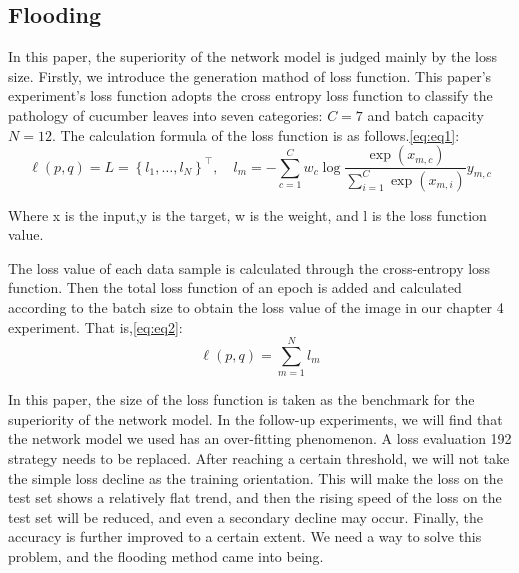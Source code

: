 \documentclass[a4paper,fleqn]{cas-sc}
\begin{document}
\subsection{Flooding}
In this paper, the superiority of the network model is judged mainly by the loss size. Firstly, we introduce the generation mathod of loss function. This paper's experiment's loss function adopts the cross entropy loss function to classify the pathology of cucumber leaves into seven categories: $C=7$ and batch capacity $N=12$. The calculation formula of the loss function is as follows.\ref{eq:eq1}:
\begin{equation}
\label{eq:eq1}
\ell(p, q)=L=\left\{l_{1}, \ldots, l_{N}\right\}^{\top}, \quad l_{m}=-\sum_{c=1}^{C} w_{c} \log \frac{\exp \left(x_{m, c}\right)}{\sum_{i=1}^{C} \exp \left(x_{m, i}\right)} y_{m, c}
\end{equation}

Where x is the input,y is the target, w is the weight, and l is the loss function value. 

The loss value of each data sample is calculated through the cross-entropy loss function. Then the total loss function of an epoch is added and calculated according to the batch size to obtain the loss value of the image in our chapter 4 experiment. That is,\ref{eq:eq2}:
\begin{equation}
\label{eq:eq2}
\ell(p,q)=\sum_{m=1}^{N} l_{m}
\end{equation}

In this paper, the size of the loss function is taken as the benchmark for the superiority of the network model. In the follow-up experiments, we will find that the network model we used has an over-fitting phenomenon. A loss evaluation 192
strategy needs to be replaced. After reaching a certain threshold, we will  not take the simple loss decline as the training orientation. This will make the loss on the test set shows a relatively flat trend, and then the rising speed of the loss on the test set will be reduced, and even a secondary decline may occur. Finally, the accuracy is further improved to a certain extent. We need a way to solve this problem, and the flooding method came into being. \citep{ishida2020we}
\end{document}
